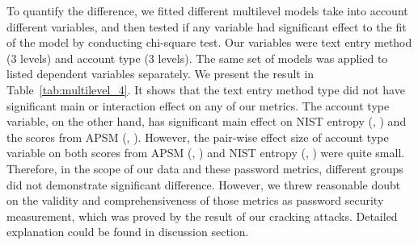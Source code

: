 \documentclass[conference]{IEEEtran}
\begin{document}
To quantify the difference, we fitted different multilevel models take into account different variables, and then tested if any variable had significant effect to the fit of the model by conducting chi-square test. Our variables were text entry method (3 levels) and account type (3 levels). The same set of models was applied to listed dependent variables separately. We present the result in Table~\ref{tab:multilevel_4}. It shows that the text entry method type did not have significant main or interaction effect on any of our metrics. The account type variable, on the other hand, has significant main effect on NIST entropy (, ) and the scores from APSM (, ). However, the pair-wise effect size of account type variable on both scores from APSM (, ) and NIST entropy (, ) were quite small. Therefore, in the scope of our data and these password metrics, different groups did not demonstrate significant difference. 
However, we threw reasonable doubt on the validity and comprehensiveness of those metrics as password security measurement, which was proved by the result of our cracking attacks. Detailed explanation could be found in discussion section.

\begin{table}[thbp]
\begin{center}
  \caption{Result of chi-square fit test on multilevel models applied on three security metrics. Variables in the model were text entry method type and account type. The term ``interaction" stands for the interaction effect between terminal type and account type.}
    \label{tab:multilevel_4}
\end{center}
\end{table}
\end{document}
